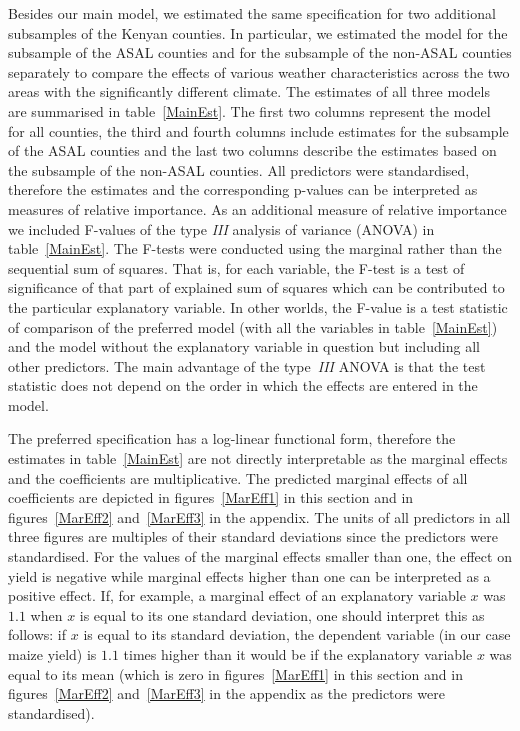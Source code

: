 \documentclass[12pt]{iopart}
\begin{document}
Besides our main model, we estimated the same specification for two additional subsamples of the Kenyan counties. In particular, we estimated the model for the subsample of the ASAL counties and for the subsample of the non-ASAL counties separately to compare the effects of various weather characteristics across the two areas with the significantly different climate. The estimates of all three models are summarised in table~\ref{MainEst}. The first two columns represent the model for all counties, the third and fourth columns include estimates for the subsample of the ASAL counties and the last two columns describe the estimates based on the subsample of the non-ASAL counties. All predictors were standardised, therefore the estimates and the corresponding p-values can be interpreted as measures of relative importance. As an additional measure of relative importance we included F-values of the type \textit{III} analysis of variance (ANOVA) in table~\ref{MainEst}. The F-tests were conducted using the marginal rather than the sequential sum of squares. That is, for each variable, the F-test is a test of significance of that part of explained sum of squares which can be contributed to the particular explanatory variable. In other worlds, the F-value is a test statistic of comparison of the preferred model (with all the variables in table~\ref{MainEst}) and the model without the explanatory variable in question but including all other predictors. The main advantage of the type~\textit{III} ANOVA is that the test statistic does not depend on the order in which the effects are entered in the model.

The preferred specification has a log-linear functional form, therefore the estimates in table~\ref{MainEst} are not directly interpretable as the marginal effects and the coefficients are multiplicative. The predicted marginal effects of all coefficients are depicted in figures~\ref{MarEff1} in this section and in figures~\ref{MarEff2} and~\ref{MarEff3} in the appendix. The units of all predictors in all three figures are multiples of their standard deviations since the predictors were standardised. For the values of the marginal effects smaller than one, the effect on yield is negative while marginal effects higher than one can be interpreted as a positive effect. If, for example, a marginal effect of an explanatory variable $x$ was $1.1$ when $x$ is equal to its one standard deviation, one should interpret this as follows: if $x$ is equal to its standard deviation, the dependent variable (in our case maize yield) is $1.1$ times higher than it would be if the explanatory variable $x$ was equal to its mean (which is zero in figures~\ref{MarEff1} in this section and in figures~\ref{MarEff2} and~\ref{MarEff3} in the appendix as the predictors were standardised). 
\end{document}
